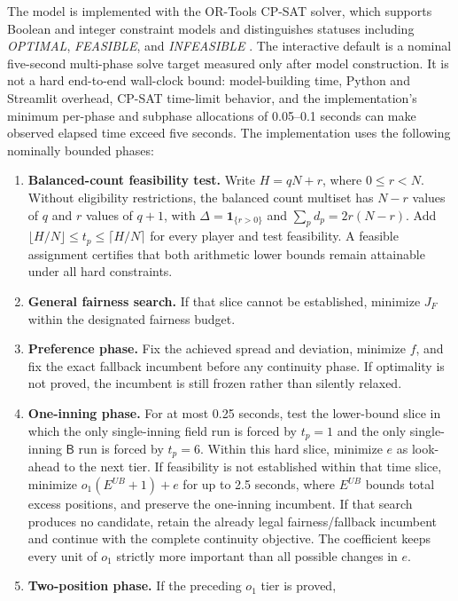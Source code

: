 \documentclass[11pt]{article}
\newcommand{\Bench}{\mathsf{B}}
\begin{document}
The model is implemented with the OR-Tools CP-SAT solver, which supports
Boolean and integer constraint models and distinguishes statuses including
\emph{OPTIMAL}, \emph{FEASIBLE}, and \emph{INFEASIBLE} \cite{ortoolscpsat}.
The interactive default is a nominal five-second multi-phase solve target measured
only after model construction. It is not a hard end-to-end wall-clock bound:
model-building time, Python and Streamlit overhead, CP-SAT time-limit behavior,
and the implementation's minimum per-phase and subphase allocations of
0.05--0.1 seconds can make observed elapsed time exceed five seconds. The implementation uses the
following nominally bounded phases:
\begin{enumerate}
    \item \textbf{Balanced-count feasibility test.} Write $H=qN+r$, where
    $0\le r<N$. Without eligibility restrictions, the balanced count multiset
    has $N-r$ values of $q$ and $r$ values of $q+1$, with
    $\Delta=\mathbf 1_{\{r>0\}}$ and $\sum_p d_p=2r(N-r)$. Add
    $\lfloor H/N\rfloor\leq t_p\leq\lceil H/N\rceil$ for every player and
    test feasibility. A feasible assignment certifies that both arithmetic
    lower bounds remain attainable under all hard constraints.
    \item \textbf{General fairness search.} If that slice cannot be established,
    minimize $J_F$ within the designated fairness budget.
    \item \textbf{Preference phase.} Fix the achieved spread and deviation,
    minimize $f$, and fix the exact fallback incumbent before any continuity
    phase. If optimality is not proved, the incumbent is still frozen rather
    than silently relaxed.
    \item \textbf{One-inning phase.} For at most 0.25 seconds, test the
    lower-bound slice in which the only single-inning field run is forced by
    $t_p=1$ and the only single-inning $\Bench$ run is forced by $t_p=6$.
    Within this hard slice, minimize $e$ as look-ahead to the next tier. If
    feasibility is not established within that time slice,
    minimize $o_1(E^{UB}+1)+e$ for up to 2.5 seconds, where $E^{UB}$ bounds total excess positions,
    and preserve the one-inning incumbent. If that search produces no
    candidate, retain the already legal fairness/fallback incumbent and
    continue with the complete continuity objective. The coefficient keeps
    every unit of $o_1$ strictly more important than all possible changes in $e$.
    \item \textbf{Two-position phase.} If the preceding $o_1$ tier is proved,

\end{enumerate}
\end{document}
